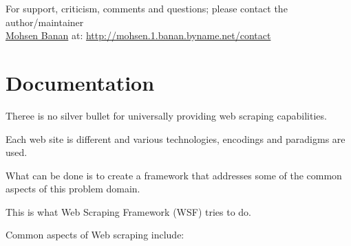 \documentclass{article}
\begin{document}
For support, criticism, comments and questions; please contact the 
author/maintainer \\
\href{http://mohsen.1.banan.byname.net}{Mohsen Banan} at: \url{http://mohsen.1.banan.byname.net/contact}


\section{Documentation}

Theree is no silver bullet for universally providing web scraping capabilities.

Each web site is different and various technologies, encodings and paradigms are used.

What can be done is to create a framework that addresses some of the common aspects of this problem domain.

This is what Web Scraping Framework (WSF) tries to do.

Common aspects of Web scraping include:
\end{document}
